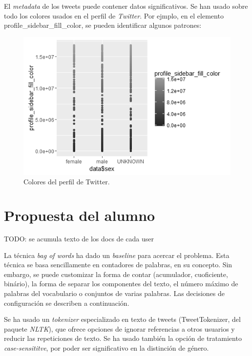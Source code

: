 \documentclass[11pt,a4paper]{article}
\begin{document}
  El {\em metadata} de los tweets puede contener datos significativos. Se han usado sobre todo los colores usados en el perfil de {\em Twitter}. Por ejmplo, en el elemento {\ttfamily profile\_sidebar\_fill\_color}, se pueden identificar algunos patrones:
   
  \begin{figure}[ht!]
    \includegraphics[width=\linewidth]{profile_colors.png}
    \caption{Colores del perfil de Twitter.}
    \label{fig:profile_colors}
  \end{figure}
  

\section{Propuesta del alumno}

  TODO: se acumula texto de los docs de cada user

  La t\'ecnica {\em bag of words} ha dado un {\em baseline} para acercar el problema. Esta t\'ecnica se basa sencillamente en contadores de palabras, en su concepto. Sin embargo, se puede customizar la forma de contar (acumulador, cuoficiente, bin\'ario), la forma de separar los componentes del texto, el n\'umero m\'aximo de palabras del vocabulario o conjuntos de varias palabras. Las decisiones de configuraci\'on se describen a continuaci\'on.

  Se ha usado un {\em tokenizer} especializado en texto de tweets ({\ttfamily TweetTokenizer}, del paquete {\em NLTK}), que ofrece opciones de ignorar referencias a otros usuarios y reducir las repeticiones de texto. Se ha usado tambi\'en la opci\'on de tratamiento {\em case-sensititve}, por poder ser significativo en la distinci\'on de g\'enero.
\end{document}
